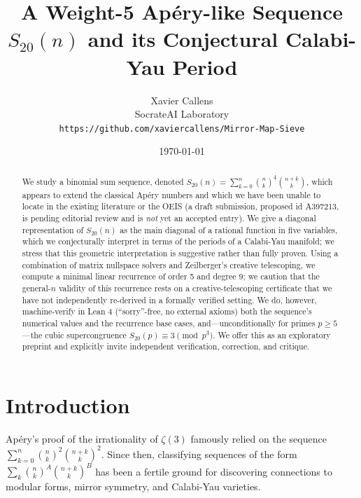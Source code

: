 \documentclass[11pt, a4paper]{article}
\title{A Weight-5 Apéry-like Sequence $S_{20}(n)$ and its Conjectural Calabi-Yau Period}
\author{Xavier Callens \\ SocrateAI Laboratory \\ \texttt{https://github.com/xaviercallens/Mirror-Map-Sieve}}
\date{\today}
\begin{document}
\maketitle

\begin{abstract}
We study a binomial sum sequence, denoted $S_{20}(n) = \sum_{k=0}^n \binom{n}{k}^4 \binom{n+k}{k}$, which appears to extend the classical Apéry numbers and which we have been unable to locate in the existing literature or the OEIS (a draft submission, proposed id A397213, is pending editorial review and is \emph{not} yet an accepted entry). We give a diagonal representation of $S_{20}(n)$ as the main diagonal of a rational function in five variables, which we conjecturally interpret in terms of the periods of a Calabi-Yau manifold; we stress that this geometric interpretation is suggestive rather than fully proven. Using a combination of matrix nullspace solvers and Zeilberger's creative telescoping, we compute a minimal linear recurrence of order 5 and degree 9; we caution that the general-$n$ validity of this recurrence rests on a creative-telescoping certificate that we have not independently re-derived in a formally verified setting. We do, however, machine-verify in Lean 4 (``sorry''-free, no external axioms) both the sequence's numerical values and the recurrence base cases, and---unconditionally for primes $p\ge 5$---the cubic supercongruence $S_{20}(p)\equiv 3\pmod{p^3}$. We offer this as an exploratory preprint and explicitly invite independent verification, correction, and critique.
\end{abstract}

\section{Introduction}
Apéry's proof of the irrationality of $\zeta(3)$ famously relied on the sequence $\sum_{k=0}^n \binom{n}{k}^2 \binom{n+k}{k}^2$. Since then, classifying sequences of the form $\sum_k \binom{n}{k}^A \binom{n+k}{k}^B$ has been a fertile ground for discovering connections to modular forms, mirror symmetry, and Calabi-Yau varieties.
\end{document}
